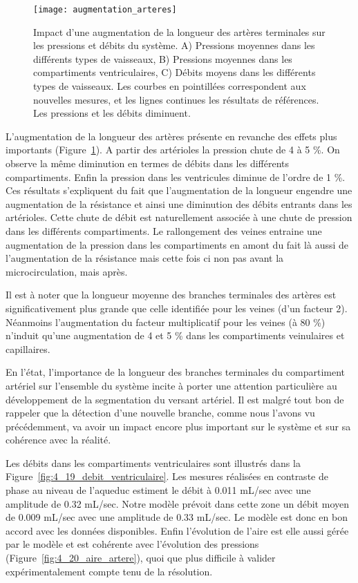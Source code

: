 \begin{figure}[!t]
\centering
\texttt{[image: augmentation\_arteres]}
\caption{Impact d’une augmentation de la longueur des artères terminales sur les pressions et débits du système. A) Pressions moyennes dans les différents types de vaisseaux, B) Pressions moyennes dans les compartiments ventriculaires, C) Débits moyens dans les différents types de vaisseaux. Les courbes en pointillées correspondent aux nouvelles mesures, et les lignes continues les résultats de références. Les pressions et les débits diminuent.}
\label{fig:augmentation_arteres}	
\end{figure}
L’augmentation de la longueur des artères présente en revanche des effets plus importants (Figure~\ref{fig:augmentation_arteres}). A partir des artérioles la pression chute de 4 à 5 \%. On observe la même diminution en termes de débits dans les différents compartiments. Enfin la pression dans les ventricules diminue de l’ordre de 1 \%. Ces résultats s’expliquent du fait que l’augmentation de la longueur engendre une augmentation de la résistance et ainsi une diminution des débits entrants dans les artérioles. Cette chute de débit est naturellement associée à une chute de pression dans les différents compartiments. Le rallongement des veines entraine une augmentation de la pression dans les compartiments en amont du fait là aussi de l’augmentation de la résistance mais cette fois ci non pas avant la microcirculation, mais après.

Il est à noter que la longueur moyenne des branches terminales des artères est significativement plus grande que celle identifiée pour les veines (d’un facteur 2). Néanmoins l’augmentation du facteur multiplicatif pour les veines (à 80 \%) n’induit qu’une augmentation de 4 et 5 \% dans les compartiments veinulaires et capillaires. 

En l’état, l’importance de la longueur des branches terminales du compartiment artériel sur l’ensemble du système incite à porter une attention particulière au développement de la segmentation du versant artériel. Il est malgré tout bon de rappeler que la détection d’une nouvelle branche, comme nous l’avons vu précédemment, va avoir un impact encore plus important sur le système et sur sa cohérence avec la réalité. 

Les débits dans les compartiments ventriculaires sont illustrés dans la Figure~\ref{fig:4_19_debit_ventriculaire}. Les mesures
réalisées en contraste de phase au niveau de l’aqueduc estiment le débit à 0.011 mL/sec avec une
amplitude de 0.32 mL/sec. Notre modèle prévoit dans cette zone un débit moyen de 0.009 mL/sec
avec une amplitude de 0.33 mL/sec. Le modèle est donc en bon accord avec les données disponibles.
Enfin l’évolution de l’aire est elle aussi gérée par le modèle et est cohérente avec l’évolution des
pressions (Figure~\ref{fig:4_20_aire_artere}), quoi que plus difficile à valider expérimentalement compte tenu de la résolution.

